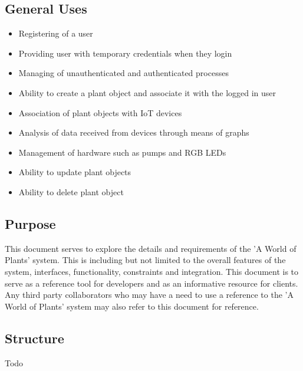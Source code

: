 \documentclass{article}
\begin{document}
	\subsection{General Uses}
		\begin{itemize}
			\item Registering of a user
			\item Providing user with temporary credentials when they login
			\item Managing of unauthenticated and authenticated processes
			\item Ability to create a plant object and associate it with the logged in user
			\item Association of plant objects with IoT devices
			\item Analysis of data received from devices through means of graphs
			\item Management of hardware such as pumps and RGB LEDs
			\item Ability to update plant objects
			\item Ability to delete plant object
		\end{itemize}
	\subsection{Purpose}
		This document serves to explore the details and requirements of the 'A World of Plants' system. This is including
but not limited to the overall features of the system, interfaces, functionality, constraints and integration. This document is to serve as a reference tool for developers and as an informative resource for clients. Any third party collaborators who may have a need to use a reference to the 'A World of Plants' system may also refer to this document for reference.
	\subsection{Structure}
		Todo
\end{document}
